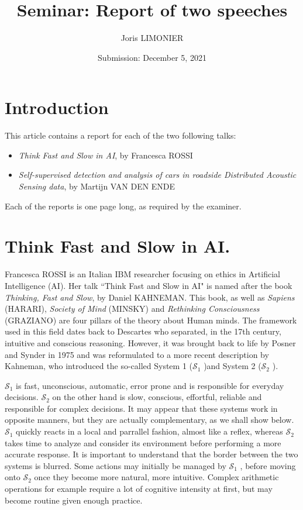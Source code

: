 \documentclass[oneside, 10pt]{article}
\title{Seminar: Report of two speeches}
\author{Joris LIMONIER}
\date{Submission: December 5, 2021}
\newcommand{\so}{\ensuremath{\mathcal{S}_1} }
\newcommand{\st}{\ensuremath{\mathcal{S}_2} }
\begin{document}
\maketitle

\vspace{2cm}
\section*{Introduction}
This article contains a report for each of the two following talks:
\begin{itemize}
  \item \textit{Think Fast and Slow in AI}, by Francesca ROSSI
  \item \textit{Self-supervised detection and analysis of cars in roadside Distributed Acoustic Sensing data}, by Martijn VAN DEN ENDE
\end{itemize}
Each of the reports is one page long, as required by the examiner.

\newpage
{}


\section{Think Fast and Slow in AI.}
Francesca ROSSI is an Italian IBM researcher focusing on ethics in Artificial Intelligence (AI). Her talk ``Think Fast and Slow in AI" is named after the book \textit{Thinking, Fast and Slow}, by Daniel KAHNEMAN. This book, as well as \textit{Sapiens} (HARARI), \textit{Society of Mind} (MINSKY) and \textit{Rethinking Consciousness} (GRAZIANO) are four pillars of the theory about Human minds. The framework used in this field dates back to Descartes who separated, in the 17th century, intuitive and conscious reasoning. However, it was brought back to life by Posner and Synder in 1975 and was reformulated to a more recent description by Kahneman, who introduced the so-called System 1 (\so)and System 2 (\st).

\so is fast, unconscious, automatic, error prone and is responsible for everyday decisions. \st on the other hand is slow, conscious, effortful, reliable and responsible for complex decisions. It may appear that these systems work in opposite manners, but they are actually complementary, as we shall show below. \so quickly reacts in a local and parrallel fashion, almost like a reflex, whereas \st takes time to analyze and consider its environment before performing a more accurate response. It is important to understand that the border between the two systems is blurred. Some actions may initially be managed by \so, before moving onto \st once they become more natural, more intuitive. Complex arithmetic operations for example require a lot of cognitive intensity at first, but may become routine given enough practice.
\end{document}
